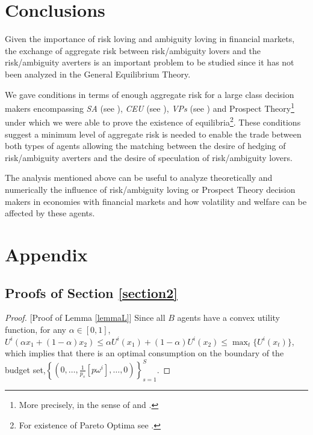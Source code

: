\documentclass[pdftex]{article}
\numberwithin{equation}{section}
\theoremstyle{th}
\newtheorem{proof lemma}{{Proof Lemma}.}
\theoremstyle{definition}
\begin{document}
{\section{Conclusions}
\label{sectconc}
Given the importance of risk loving and ambiguity loving in financial markets, the exchange of aggregate risk between risk/ambiguity lovers and the risk/ambiguity averters is an important problem to be studied since it has not been analyzed in the General Equilibrium Theory.

We gave conditions in terms of enough aggregate risk for a large class decision makers encompassing \emph{SA} (see \cite{KMM}), \emph{CEU} (see \cite{Schmeidler}), \emph{VPs} (see \cite{MMR}) and Prospect Theory\footnote{More precisely, in the sense of \cite{JS} and \cite{KT92}.} under which we were able to prove the existence of equilibria\footnote{For existence of Pareto Optima see \cite{ABCN}.}. These conditions suggest a minimum level of aggregate risk is needed to enable the trade between both types of agents allowing the matching between the desire of hedging of risk/ambiguity averters and the desire of speculation of risk/ambiguity lovers.

The analysis mentioned above can be useful to analyze theoretically and numerically the influence of risk/ambiguity loving or Prospect Theory decision makers in economies with financial markets and how volatility and welfare can be affected by these agents.


\appendix

\section{Appendix}
\subsection{Proofs of Section \ref{section2}}\label{appA1}





\label{prooflemmaL} \begin{proof}{[}Proof of Lemma \ref{lemmaL}{]}
Since all $B$ agents have a convex utility function, for any $\alpha\in[0,1]$,
$U^{i}(\alpha{x}_{1}+(1-\alpha)x_{2})\leq\alpha{U}^{i}(x_{1})+(1-\alpha)U^{i}(x_{2})\leq\max_{t}\{U^{i}(x_{t})\}$,
which implies that there is an optimal consumption on the boundary
of the budget set,$\left\{ \left(0,\dots,\frac{1}{p_{s}}\left[p\omega^{i}\right],\dots,0\right)\right\} _{s=1}^{S}$.
\end{proof}

}
\end{document}
